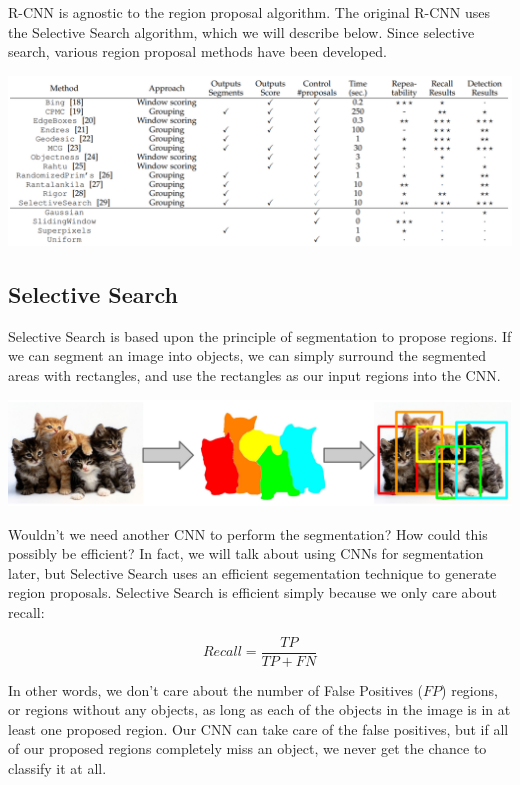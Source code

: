 \documentclass{article}
\begin{document}
R-CNN is agnostic to the region proposal algorithm. The original R-CNN uses the Selective Search algorithm, which we will describe below. Since selective search, various region proposal methods have been developed.

\begin{center}
\includegraphics[scale=0.5]{table.PNG}
\end{center}


\subsection{Selective Search}

Selective Search is based upon the principle of segmentation to propose regions. If we can segment an image into objects, we can simply surround the segmented areas with rectangles, and use the rectangles as our input regions into the CNN.



\begin{center}
\includegraphics[scale=0.4]{segment.PNG}
\end{center}


Wouldn't we need another CNN to perform the segmentation? How could this possibly be efficient? In fact, we will talk about using CNNs for segmentation later, but Selective Search uses an efficient segementation technique to generate region proposals. Selective Search is efficient simply because we only care about recall:

\[Recall = \frac{TP}{TP + FN}\]

In other words, we don't care about the number of False Positives ($FP$) regions, or regions without any objects, as long as each of the objects in the image is in at least one proposed region. Our CNN can take care of the false positives, but if all of our proposed regions completely miss an object, we never get the chance to classify it at all.
\end{document}
